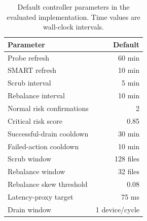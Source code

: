 \begin{table}[t]
  \centering
  \small
  \caption{Default controller parameters in the evaluated implementation. Time values are wall-clock intervals.}
  \label{tab:defaults}
  \begin{tabular}{@{}lr@{}}
    \toprule
    Parameter & Default \\
    \midrule
    Probe refresh & 60 min \\
    SMART refresh & 10 min \\
    Scrub interval & 5 min \\
    Rebalance interval & 10 min \\
    Normal risk confirmations & 2 \\
    Critical risk score & 0.85 \\
    Successful-drain cooldown & 30 min \\
    Failed-action cooldown & 10 min \\
    Scrub window & 128 files \\
    Rebalance window & 32 files \\
    Rebalance skew threshold & 0.08 \\
    Latency-proxy target & 75 ms \\
    Drain window & 1 device/cycle \\
    \bottomrule
  \end{tabular}
\end{table}
